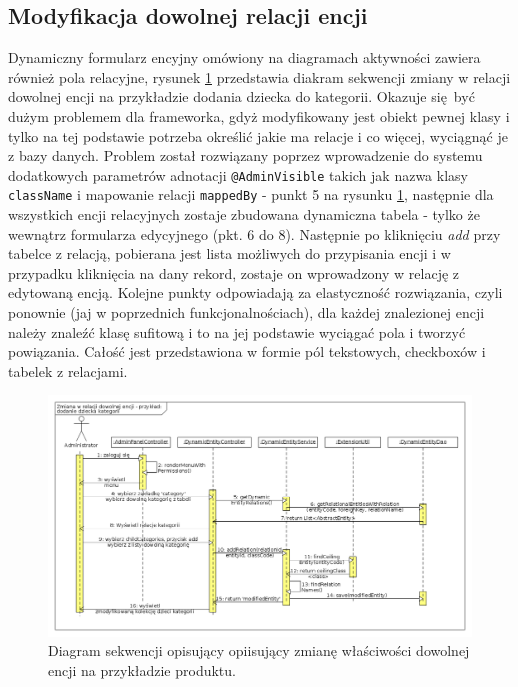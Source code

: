 \subsection{Modyfikacja dowolnej relacji encji}
Dynamiczny formularz encyjny omówiony na diagramach aktywności zawiera również pola relacyjne, rysunek \ref{zmianaWRel} przedstawia diakram sekwencji zmiany w relacji dowolnej encji na przykładzie dodania dziecka do kategorii. Okazuje się być dużym problemem dla frameworka, gdyż modyfikowany jest obiekt pewnej klasy i tylko na tej podstawie potrzeba określić jakie ma relacje i co więcej, wyciągnąć je z bazy danych. Problem został rozwiązany poprzez wprowadzenie do systemu dodatkowych parametrów adnotacji \texttt{@AdminVisible} takich jak nazwa klasy \texttt{className} i mapowanie relacji \texttt{mappedBy} - punkt 5 na rysunku \ref{zmianaWRel}, następnie dla wszystkich encji relacyjnych zostaje zbudowana dynamiczna tabela - tylko że wewnątrz formularza edycyjnego (pkt. 6 do 8). Następnie po kliknięciu \textit{add} przy tabelce z relacją, pobierana jest lista możliwych do przypisania encji i w przypadku kliknięcia na dany rekord, zostaje on wprowadzony w relację z edytowaną encją. Kolejne punkty odpowiadają za elastyczność rozwiązania, czyli ponownie (jaj w poprzednich funkcjonalnościach), dla każdej znalezionej encji należy znaleźć klasę sufitową i to na jej podstawie wyciągać pola i tworzyć powiązania. Całość jest przedstawiona w formie pól tekstowych, checkboxów i tabelek z relacjami.
 \begin{figure}
 	\begin{center}
 		\includegraphics[scale=0.4]{zmianaWRel.png}
 	\end{center}
 	\caption{{\color{black}Diagram sekwencji opisujący opiisujący zmianę właściwości dowolnej encji na przykładzie produktu.}} \label{zmianaWRel}
 \end{figure}

